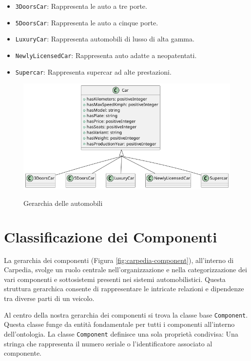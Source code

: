 \begin{itemize}
    \item \texttt{3DoorsCar}: Rappresenta le auto a tre porte.
    \item \texttt{5DoorsCar}: Rappresenta le auto a cinque porte.
    \item \texttt{LuxuryCar}: Rappresenta automobili di lusso di alta gamma.
    \item \texttt{NewlyLicensedCar}: Rappresenta auto adatte a neopatentati.
    \item \texttt{Supercar}: Rappresenta supercar ad alte prestazioni.
\end{itemize}

\begin{figure}[H]
    \caption{Gerarchia delle automobili}
    \includegraphics[width=\textwidth]{figures/carpedia-car.png}
    \label{fig:carpedia-car}
\end{figure}

\section{Classificazione dei Componenti}

La gerarchia dei componenti (Figura \ref{fig:carpedia-component}), all'interno di Carpedia, svolge un ruolo centrale nell'organizzazione e nella categorizzazione dei vari componenti e sottosistemi presenti nei sistemi automobilistici. Questa struttura gerarchica consente di rappresentare le intricate relazioni e dipendenze tra diverse parti di un veicolo.

Al centro della nostra gerarchia dei componenti si trova la classe base \texttt{Component}. Questa classe funge da entità fondamentale per tutti i componenti all'interno dell'ontologia. La classe \texttt{Component} definisce una sola proprietà condivisa: Una stringa che rappresenta il numero seriale o l'identificatore associato al componente.

